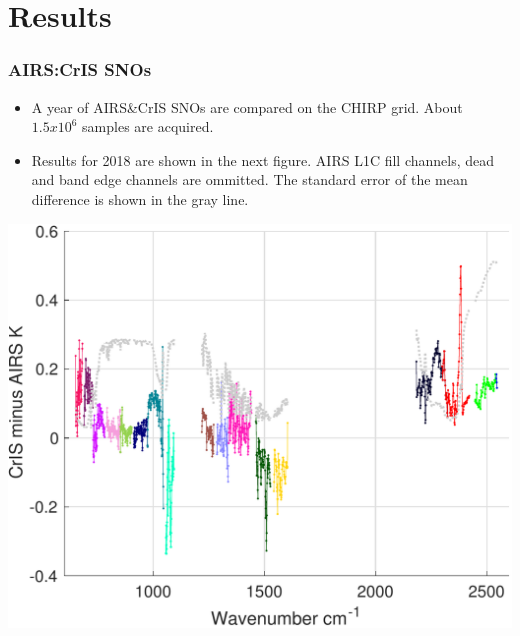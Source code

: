 \documentclass[10pt,t]{beamer}
\begin{document}
\section{Results}
\begin{frame}
  \frametitle{AIRS:CrIS SNOs}
  \begin{itemize}
  \item A year of AIRS\&CrIS SNOs are compared on the CHIRP grid. About $1.5 x 10^6$ samples are acquired.
    \item Results for 2018 are shown in the next figure. AIRS L1C fill channels, dead and band edge channels are ommitted. The standard error of the mean difference is shown in the gray line.
  \end{itemize}

  \begin{center}
    \includegraphics[width=0.8\linewidth]{./Figs/Pdf/ac_sno_2018_bias_stderr_coloraslp.pdf}
  \end{center}

\end{frame}
\end{document}
